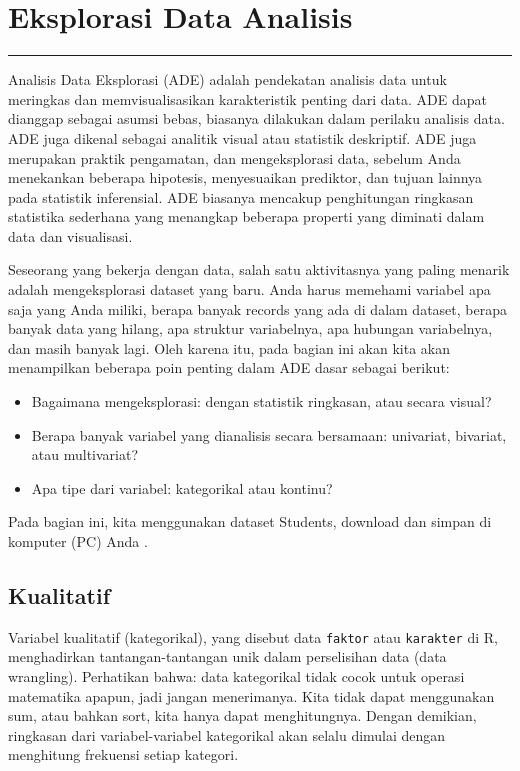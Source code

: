 \documentclass[
]{book}
\providecommand{\tightlist}{%
  \setlength{\itemsep}{0pt}\setlength{\parskip}{0pt}}
\begin{document}
\hypertarget{Eksplorasi-Data-Analisis}{%
\chapter{Eksplorasi Data Analisis}\label{Eksplorasi-Data-Analisis}}

\begin{center}\rule{0.5\linewidth}{0.5pt}\end{center}

Analisis Data Eksplorasi (ADE) adalah pendekatan analisis data untuk meringkas dan memvisualisasikan karakteristik penting dari data. ADE dapat dianggap sebagai asumsi bebas, biasanya dilakukan dalam perilaku analisis data. ADE juga dikenal sebagai analitik visual atau statistik deskriptif. ADE juga merupakan praktik pengamatan, dan mengeksplorasi data, sebelum Anda menekankan beberapa hipotesis, menyesuaikan prediktor, dan tujuan lainnya pada statistik inferensial. ADE biasanya mencakup penghitungan ringkasan statistika sederhana yang menangkap beberapa properti yang diminati dalam data dan visualisasi.

Seseorang yang bekerja dengan data, salah satu aktivitasnya yang paling menarik adalah mengeksplorasi dataset yang baru. Anda harus memehami variabel apa saja yang Anda miliki, berapa banyak records yang ada di dalam dataset, berapa banyak data yang hilang, apa struktur variabelnya, apa hubungan variabelnya, dan masih banyak lagi. Oleh karena itu, pada bagian ini akan kita akan menampilkan beberapa poin penting dalam ADE dasar sebagai berikut:

\begin{itemize}
\tightlist
\item
  Bagaimana mengeksplorasi: dengan statistik ringkasan, atau secara visual?
\item
  Berapa banyak variabel yang dianalisis secara bersamaan: univariat, bivariat, atau multivariat?
\item
  Apa tipe dari variabel: kategorikal atau kontinu?
\end{itemize}

Pada bagian ini, kita menggunakan dataset Students, download dan simpan di komputer (PC) Anda .

\hypertarget{kualitatif}{%
\section{Kualitatif}\label{kualitatif}}

Variabel kualitatif (kategorikal), yang disebut data \texttt{faktor} atau \texttt{karakter} di R, menghadirkan tantangan-tantangan unik dalam perselisihan data (data wrangling). Perhatikan bahwa: data kategorikal tidak cocok untuk operasi matematika apapun, jadi jangan menerimanya. Kita tidak dapat menggunakan sum, atau bahkan sort, kita hanya dapat menghitungnya. Dengan demikian, ringkasan dari variabel-variabel kategorikal akan selalu dimulai dengan menghitung frekuensi setiap kategori.
\end{document}
